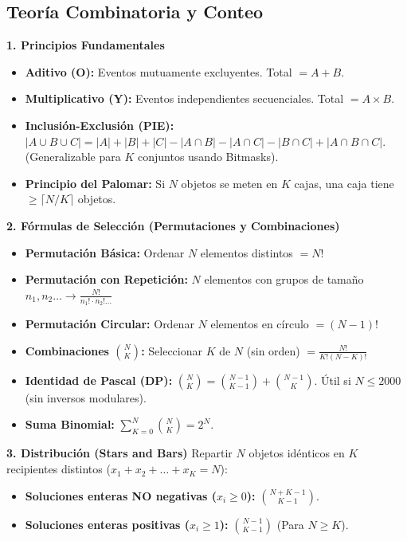 \subsection{Teoría Combinatoria y Conteo}

\textbf{1. Principios Fundamentales}
\begin{itemize}
    \item \textbf{Aditivo (O):} Eventos mutuamente excluyentes. Total $= A + B$.
    \item \textbf{Multiplicativo (Y):} Eventos independientes secuenciales. Total $= A \times B$.
    \item \textbf{Inclusión-Exclusión (PIE):} $|A \cup B \cup C| = |A| + |B| + |C| - |A \cap B| - |A \cap C| - |B \cap C| + |A \cap B \cap C|$. (Generalizable para $K$ conjuntos usando Bitmasks).
    \item \textbf{Principio del Palomar:} Si $N$ objetos se meten en $K$ cajas, una caja tiene $\ge \lceil N / K \rceil$ objetos.
\end{itemize}

\textbf{2. Fórmulas de Selección (Permutaciones y Combinaciones)}
\begin{itemize}
    \item \textbf{Permutación Básica:} Ordenar $N$ elementos distintos $= N!$
    \item \textbf{Permutación con Repetición:} $N$ elementos con grupos de tamaño $n_1, n_2 \dots \rightarrow \frac{N!}{n_1! \cdot n_2! \dots}$
    \item \textbf{Permutación Circular:} Ordenar $N$ elementos en círculo $= (N-1)!$
    \item \textbf{Combinaciones $\binom{N}{K}$:} Seleccionar $K$ de $N$ (sin orden) $= \frac{N!}{K!(N-K)!}$
    \item \textbf{Identidad de Pascal (DP):} $\binom{N}{K} = \binom{N-1}{K-1} + \binom{N-1}{K}$. Útil si $N \le 2000$ (sin inversos modulares).
    \item \textbf{Suma Binomial:} $\sum_{K=0}^{N} \binom{N}{K} = 2^N$.
\end{itemize}

\textbf{3. Distribución (Stars and Bars)}
Repartir $N$ objetos idénticos en $K$ recipientes distintos ($x_1 + x_2 + \dots + x_K = N$):
\begin{itemize}
    \item \textbf{Soluciones enteras NO negativas ($x_i \ge 0$):} $\binom{N+K-1}{K-1}$.
    \item \textbf{Soluciones enteras positivas ($x_i \ge 1$):} $\binom{N-1}{K-1}$ (Para $N \ge K$).
\end{itemize}

